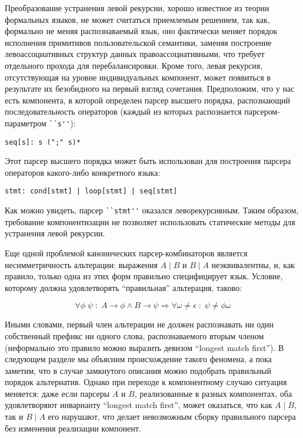 \documentclass[conference]{IEEEtran}
\begin{document}
Преобразование устранения левой рекурсии, хорошо известное из теории формальных языков, не может считаться приемлемым решением, так как,
формально не меняя распознаваемый язык, оно фактически меняет порядок исполнения примитивов пользовательской семантики, заменяя
построение левоассоциативных структур данных правоассоциативными, что требует отдельного прохода для перебалансировки. Кроме того,
левая рекурсия, отсутствующая на уровне индивидуальных компонент, может появиться в результате их безобидного на первый взгляд сочетания.
Предположим, что у нас есть компонента, в которой определен парсер высшего порядка, распознающий последовательность операторов (каждый из которых
распознается парсером-параметром \lstinline|``s''|):

\begin{lstlisting}[basicstyle=\small]
  seq[s]: s (";" s)*
\end{lstlisting}

Этот парсер высшего порядка может быть использован для построения парсера операторов какого-либо конкретного языка:

\begin{lstlisting}[basicstyle=\small]
  stmt: cond[stmt] | loop[stmt] | seq[stmt]
\end{lstlisting}

Как можно увидеть, парсер \lstinline|``stmt''| оказался леворекурсивным. Таким образом, требование компонентизации не позволяет
использовать статические методы для устранения левой рекурсии.

Еще одной проблемой канонических парсер-комбинаторов является несимметричность альтерации: выражения $A \mid B$ и $B\mid A$
неэквивалентны, и, как правило, только одна из этих форм правильно специфицирует язык. Условие, которому должна удовлетворять
``правильная'' альтерация, таково:

\[
\forall\phi\;\psi\;:\; A\rightarrow\phi \wedge B\rightarrow\psi \Rightarrow \forall\omega\ne\epsilon\;:\;\psi\ne\phi\omega
\]

Иными словами, первый член альтерации не должен распознавать ни один собственный префикс ни одного слова, распознаваемого
вторым членом (неформально это правило можно выразить девизом ``longest match first''). В следующем разделе мы объясним происхождение такого феномена,
а пока заметим, что в случае замкнутого описания можно подобрать правильный порядок альтернатив. Однако при переходе к компонентному случаю
ситуация меняется: даже если парсеры $A$ и $B$, реализованные в разных компонентах, оба удовлетворяют инварианту ``longest match first'', может оказаться,
что как $A\mid B$, так и $B\mid A$ его нарушают, что делает невозможным сборку правильного парсера без изменения реализации компонент.
\end{document}
